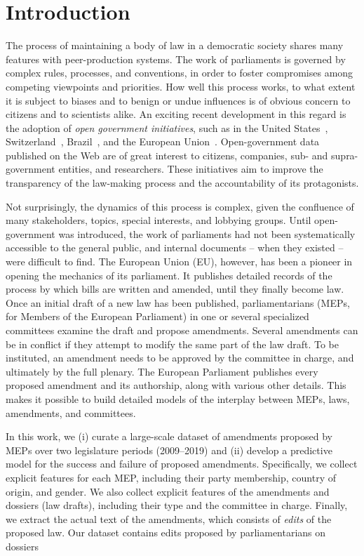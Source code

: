 \section{Introduction}
\label{sec:intro}

The process of maintaining a body of law in a democratic society shares many features with peer-production systems.
The work of parliaments is governed by complex rules, processes, and conventions, in order to foster compromises among competing viewpoints and priorities.
How well this process works, to what extent it is subject to biases and to benign or undue influences is of obvious concern to citizens and to scientists alike.
An exciting recent development in this regard is the adoption of {\em open government initiatives}, such as in the United States~\citep{open2009barack}, Switzerland~\citep{switzerland2021open}, Brazil~\citep{brazil2021dado}, and the European Union~\citep{european2021data}.
Open-government data published on the Web are of great interest to citizens, companies, sub- and supra-government entities, and researchers.
These initiatives aim to improve the transparency of the law-making process and the accountability of its protagonists.

Not surprisingly, the dynamics of this process is complex, given the confluence of many stakeholders, topics, special interests, and lobbying groups.
Until open-government was introduced, the work of parliaments had not been systematically accessible to the general public, and internal documents -- when they existed -- were difficult to find.
The European Union (EU), however, has been a pioneer in opening the mechanics of its parliament.
It publishes detailed records of the process by which bills are written and amended, until they finally become law.
Once an initial draft of a new law has been published, parliamentarians (MEPs, for Members of the European Parliament) in one or several specialized committees examine the draft and propose amendments.
Several amendments can be in conflict if they attempt to modify the same part of the law draft.
To be instituted, an amendment needs to be approved by the committee in charge, and ultimately by the full plenary.
The European Parliament publishes every proposed amendment and its authorship, along with various other details.
This makes it possible to build detailed models of the interplay between MEPs, laws, amendments, and committees.

In this work, we (i) curate a large-scale dataset of amendments proposed by MEPs over two legislature periods (2009--2019) and (ii) develop a predictive model for the success and failure of proposed amendments.
Specifically, we collect explicit features for each MEP, including their party membership, country of origin, and gender.
We also collect explicit features of the amendments and dossiers (law drafts), including  their type and the committee in charge.
Finally, we extract the actual text of the amendments, which consists of \emph{edits} of the proposed law.
Our dataset contains  edits proposed by  parliamentarians on  dossiers

